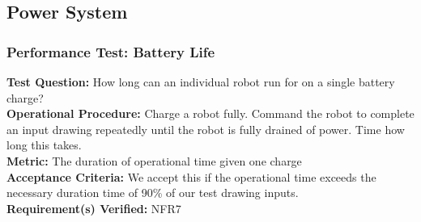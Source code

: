 
\subsection{Power System}
\label{sec:verification_power}

\subsubsection{Performance Test: Battery Life}
\label{test:power_pt_battery}
\textbf{Test Question:} How long can an individual robot run for on a single battery charge? \\
\textbf{Operational Procedure:} Charge a robot fully. Command the robot to complete an input drawing repeatedly until the robot is fully drained of power. Time how long this takes. \\
\textbf{Metric:} The duration of operational time given one charge \\
\textbf{Acceptance Criteria:} We accept this if the operational time exceeds the necessary duration time of 90\% of our test drawing inputs. \\
\textbf{Requirement(s) Verified:} NFR7 \\
